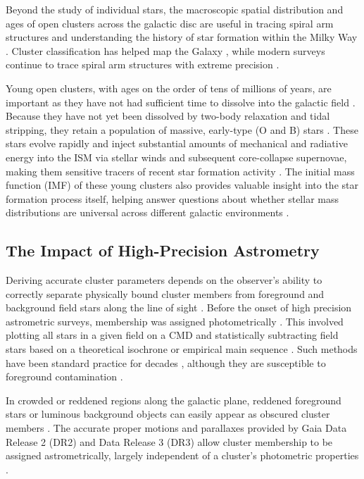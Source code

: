 \documentclass{CU_IOPStyle_PXT999}
\begin{document}
Beyond the study of individual stars, the macroscopic spatial distribution and ages of open clusters across the galactic disc are useful in tracing spiral arm structures and understanding the history of star formation within the Milky Way \cite{dias_new_2002, vande_2010}. Cluster classification has helped map the Galaxy \cite{ruprecht_classification_1966, janes_galactic_1994}, while modern surveys continue to trace spiral arm structures with extreme precision \cite{cantat-gaudin_painting_2020}. 

Young open clusters, with ages on the order of tens of millions of years, are important as they have not had sufficient time to dissolve into the galactic field \cite{lada_embedded_2003}. Because they have not yet been dissolved by two-body relaxation and tidal stripping, they retain a population of massive, early-type (O and B) stars \cite{portegies_zwart_star_2001}. These stars evolve rapidly and inject substantial amounts of mechanical and radiative energy into the ISM via stellar winds and subsequent core-collapse supernovae, making them sensitive tracers of recent star formation activity \cite{phelps_young_1993}. The initial mass function (IMF) of these young clusters also provides valuable insight into the star formation process itself, helping answer questions about whether stellar mass distributions are universal across different galactic environments \cite{kroupa_variation_2001}.

\subsection{The Impact of High-Precision Astrometry}
\label{ssec:1.3}
Deriving accurate cluster parameters depends on the observer's ability to correctly separate physically bound cluster members from foreground and background field stars along the line of sight \cite{balaguer-nunez_determination_1998, sanders_71}. Before the onset of high precision astrometric surveys, membership was assigned photometrically \cite{janes_1988, gimenez_rgu_1980}. This involved plotting all stars in a given field on a CMD and statistically subtracting field stars based on a theoretical isochrone or empirical main sequence \cite{yadav_optical_2008}. Such methods have been standard practice for decades \cite{gimenez_rgu_1980}, although they are susceptible to foreground contamination \cite{gerasimenko_investigation_1991, Maciejewski_2007}. 

In crowded or reddened regions along the galactic plane, reddened foreground stars or luminous background objects can easily appear as obscured cluster members \cite{Maciejewski_2007, cantat-gaudin_milky_2022}. The accurate proper motions and parallaxes provided by Gaia Data Release 2 (DR2) \cite{lindegren_2018, luri_2018} and Data Release 3 (DR3) \cite{lindegren_2021} allow cluster membership to be assigned astrometrically, largely independent of a cluster's photometric properties \cite{gaia_collaboration_gaia_2023}. 
\end{document}
